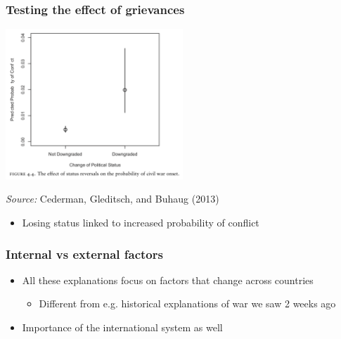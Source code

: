 \documentclass[aspectratio=43]{beamer}
\begin{document}
\begin{frame}
\frametitle{Testing the effect of grievances}
\centering

\includegraphics[width = 0.5\textwidth]{img/cgb_effect_downgrading}

\vspace{10pt}

{\small \textit{Source:} Cederman, Gleditsch, and Buhaug (2013)}

\vspace{15pt}

\begin{itemize}
  \item Losing status linked to increased probability of conflict
\end{itemize}

\end{frame}

\begin{frame}
\frametitle{Internal vs external factors}
\centering

\begin{itemize}
  \item All these explanations focus on factors that change across countries
  \begin{itemize}
    \item Different from e.g. historical explanations of war we saw 2 weeks ago
  \end{itemize}
  \item Importance of the international system as well
\end{itemize}

\end{frame}
  
\end{document}

